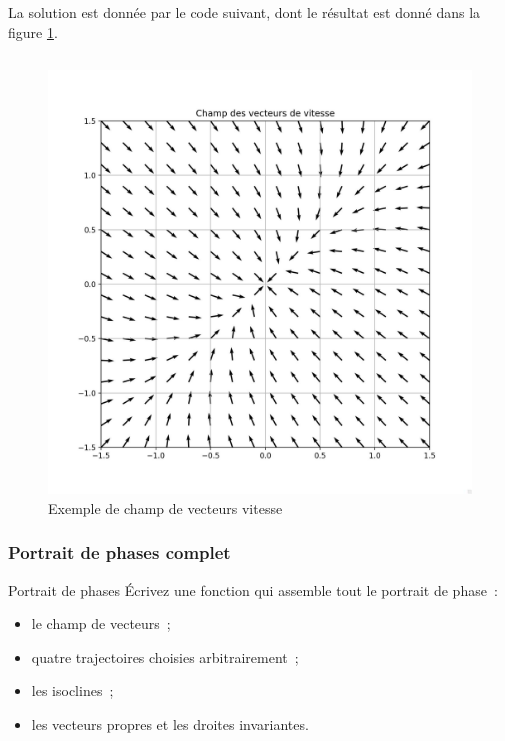                 La solution est donnée par le code suivant, dont le résultat est donné dans la figure \ref{fig:champ_vecteurs_vitesse}.
                \inputminted{python}{codes/champ_vecteurs_vitesse.py}
                \begin{figure}[ht!]
                    \centering
                    \includegraphics[width=\textwidth]{images/champ_vecteurs_vitesse.jpg}
                    \caption{Exemple de champ de vecteurs vitesse}
                    \label{fig:champ_vecteurs_vitesse}
                \end{figure}
                
            \subsubsection{Portrait de phases complet}
                \begin{exercise}{Portrait de phases}
                    Écrivez une fonction qui assemble tout le portrait de phase~:
                    \begin{itemize}
                        \item le champ de vecteurs~;
                        \item quatre trajectoires choisies arbitrairement~;
                        \item les isoclines~;
                        \item les vecteurs propres et les droites invariantes.
                    \end{itemize}
                \end{exercise}

